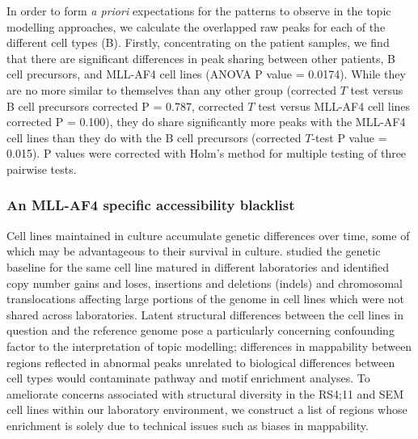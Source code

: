 
In order to form \textit{a priori} expectations for the patterns to observe in the topic modelling approaches, we calculate the overlapped raw peaks for each of the different cell types (B). Firstly, concentrating on the patient samples, we find that there are significant differences in peak sharing between other patients, B cell precursors, and MLL-AF4 cell lines (ANOVA P value = 0.0174). While they are no more similar to themselves than any other group (corrected $T$ test versus B cell precursors corrected P = 0.787, corrected $T$ test versus MLL-AF4 cell lines corrected P = 0.100), they do share significantly more peaks with the MLL-AF4 cell lines than they do with the B cell precursors (corrected $T$-test P value = 0.015). P values were corrected with Holm's method for multiple testing of three pairwise tests.

\subsubsection{An MLL-AF4 specific accessibility blacklist}

Cell lines maintained in culture accumulate genetic differences over time, some of which may be advantageous to their survival in culture. \cite{Liu2019}\textcite{Ben-David2018} studied the genetic baseline for the same cell line matured in different laboratories and identified copy number gains and loses, insertions and deletions (indels) and chromosomal translocations affecting large portions of the genome in cell lines which were not shared across laboratories. Latent structural differences between the cell lines in question and the reference genome pose a particularly concerning confounding factor to the interpretation of topic modelling; differences in mappability between regions reflected in abnormal peaks unrelated to biological differences between cell types would contaminate pathway and motif enrichment analyses. To ameliorate concerns associated with structural diversity in the RS4;11 and SEM cell lines within our laboratory environment, we construct a list of regions whose enrichment is solely due to technical issues such as biases in mappability.


